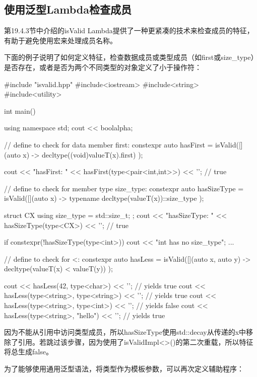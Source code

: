 \subsection{使用泛型Lambda检查成员}

第19.4.3节中介绍的isValid Lambda提供了一种更紧凑的技术来检查成员的特征，有助于避免使用宏来处理成员名称。

下面的例子说明了如何定义特征，检查数据成员或类型成员（如first或size\_type）是否存在，或者是否为两个不同类型的对象定义了小于操作符：

\begin{cpp}
#include "isvalid.hpp"
#include<iostream>
#include<string>
#include<utility>

int main()
{
	using namespace std;
	cout << boolalpha;
	
	// define to check for data member first:
	constexpr auto hasFirst
		= isValid([](auto x) -> decltype((void)valueT(x).first) {
				});

	cout << "hasFirst: " << hasFirst(type<pair<int,int>>) << '\n'; // true
	
	// define to check for member type size_type:
	constexpr auto hasSizeType
		= isValid([](auto x) -> typename decltype(valueT(x))::size_type {
				});
			
	struct CX {
		using size_type = std::size_t;
	};
	cout << "hasSizeType: " << hasSizeType(type<CX>) << '\n'; // true
	
	if constexpr(!hasSizeType(type<int>)) {
		cout << "int has no size_type\n";
		...
	}

	// define to check for <:
	constexpr auto hasLess
		= isValid([](auto x, auto y) -> decltype(valueT(x) < valueT(y)) {
				});
			
	cout << hasLess(42, type<char>) << '\n'; // yields true
	cout << hasLess(type<string>, type<string>) << '\n'; // yields true
	cout << hasLess(type<string>, type<int>) << '\n'; // yields false
	cout << hasLess(type<string>, "hello") << '\n'; // yields true
}
\end{cpp}

因为不能从引用中访问类型成员，所以hasSizeType使用std::decay从传递的x中移除了引用。若跳过该步骤，因为使用了isValidImpl<>()的第二次重载，所以特征将总生成false。

为了能够使用通用泛型语法，将类型作为模板参数，可以再次定义辅助程序：

